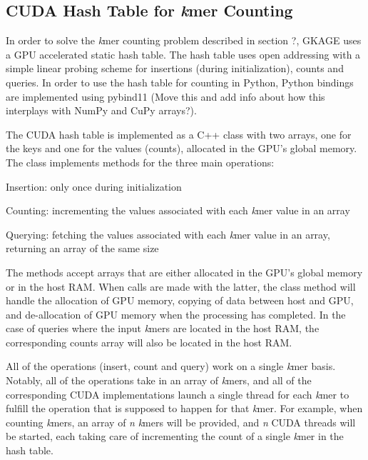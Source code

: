 \subsection{CUDA Hash Table for \textit{k}mer Counting}
In order to solve the \textit{k}mer counting problem described in section ?, GKAGE uses a GPU accelerated static hash table.
The hash table uses open addressing with a simple linear probing scheme for insertions (during initialization), counts and queries.
In order to use the hash table for counting in Python, Python bindings are implemented using pybind11 \cite{pybind11} (Move this and add info about how this interplays with NumPy and CuPy arrays?). 

The CUDA hash table is implemented as a C++ class with two arrays, one for the keys and one for the values (counts), allocated in the GPU's global memory.
The class implements methods for the three main operations:
\begin{compactenum}
  \item
    Insertion: only once during initialization
  \item
    Counting: incrementing the values associated with each \textit{k}mer value in an array
  \item
    Querying: fetching the values associated with each \textit{k}mer value in an array, returning an array of the same size
\end{compactenum}

The methods accept arrays that are either allocated in the GPU's global memory or in the host RAM.
When calls are made with the latter, the class method will handle the allocation of GPU memory, copying of data between host and GPU, and de-allocation of GPU memory when the processing has completed.
In the case of queries where the input \textit{k}mers are located in the host RAM, the corresponding counts array will also be located in the host RAM.

All of the operations (insert, count and query) work on a single \textit{k}mer basis. 
Notably, all of the operations take in an array of \textit{k}mers, and all of the corresponding CUDA implementations launch a single thread for each \textit{k}mer to fulfill the operation that is supposed to happen for that \textit{k}mer.
For example, when counting \textit{k}mers, an array of \textit{n} \textit{k}mers will be provided, and \textit{n} CUDA threads will be started, each taking care of incrementing the count of a single \textit{k}mer in the hash table.

